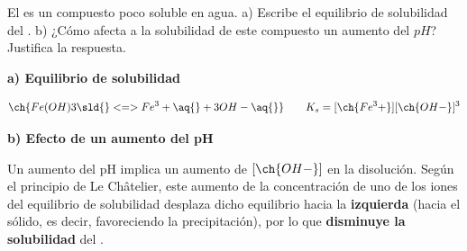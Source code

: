\begin{exerciseEVAU}
    El  es un compuesto poco soluble en agua.
    a) Escribe el equilibrio de solubilidad del .
    b) ¿Cómo afecta a la solubilidad de este compuesto un aumento del \(pH\)? Justifica la respuesta.

    \begin{solu}

        \textbf{a) Equilibrio de solubilidad}

        \begin{equation*}
            \ch{Fe(OH)3 \sld{} <=> Fe^3+ \aq{} + 3 OH- \aq{}} \qquad K_s = [\ch{Fe^3+}][\ch{OH-}]^3
        \end{equation*}

        \textbf{b) Efecto de un aumento del pH}

        Un aumento del pH implica un aumento de \([\ch{OH-}]\) en la disolución. Según el principio de Le Châtelier, este aumento de la concentración de uno de los iones del equilibrio de solubilidad desplaza dicho equilibrio hacia la \textbf{izquierda} (hacia el sólido, es decir, favoreciendo la precipitación), por lo que \textbf{disminuye la solubilidad} del .

    \end{solu}

\end{exerciseEVAU}

